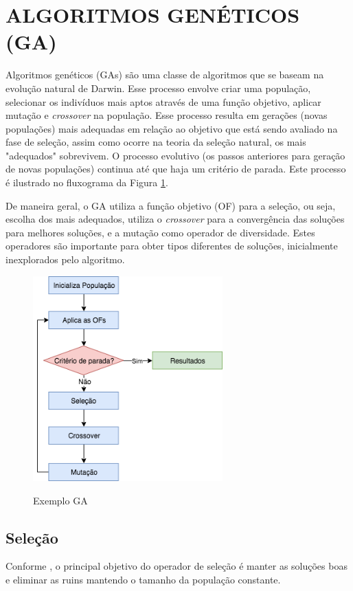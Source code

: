\section{ALGORITMOS GENÉTICOS (GA)}
Algoritmos genéticos (GAs) são uma classe de algoritmos que se baseam
na evolução natural de Darwin. Esse processo envolve criar uma população,
selecionar os indivíduos mais aptos através de uma função objetivo,
aplicar mutação e \textit{crossover} na população. 
Esse processo resulta em gerações (novas populações)
mais adequadas em relação ao objetivo que está sendo
avaliado na fase de seleção, assim como ocorre na teoria da 
seleção natural, os mais "adequados" sobrevivem. O processo evolutivo 
(os passos anteriores para geração de novas populações)
continua até que haja um critério de parada. Este processo é
ilustrado no fluxograma da Figura \ref{fig:gaalgorithm}.

De maneira geral, o GA utiliza a função objetivo (OF) para
a seleção, ou seja, escolha dos mais adequados, 
utiliza o \textit{crossover} para a convergência das soluções para melhores soluções,
e a mutação como operador de diversidade. Estes operadores são importante para
obter tipos diferentes de soluções, inicialmente inexplorados pelo algoritmo.

\begin{figure}[!htb]
  \centering
  \caption{Exemplo GA}
  \includegraphics[width=0.65\textwidth]{./dados/figuras/ga-algorithm.png}
  \label{fig:gaalgorithm}
\end{figure}

\subsection{Seleção}
Conforme \cite{ghosh}, o principal objetivo do operador de seleção é
manter as soluções boas e eliminar as ruins mantendo o tamanho da população
constante.

